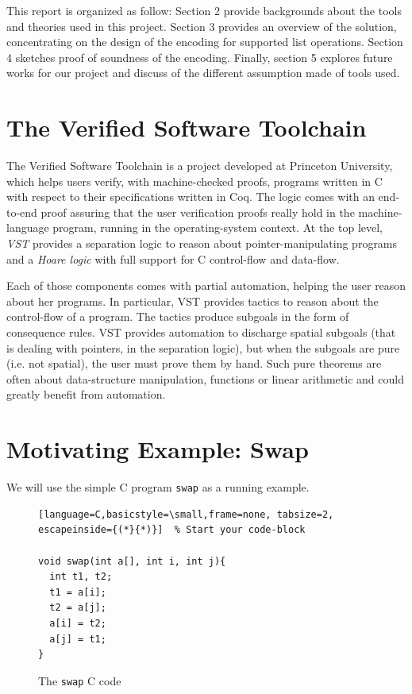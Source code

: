 \documentclass[onecolumn, preprint]{sigplanconf}
\begin{document}
This report is organized as follow: Section 2 provide backgrounds about the tools and theories used in this project. Section 3 provides an overview of the solution, concentrating on the design of the encoding for supported list operations. Section 4 sketches proof of soundness of the encoding. Finally, section 5 explores future works for our project and discuss of the different assumption made of tools used.

\section{The Verified Software Toolchain}
\label{sec:VST}

The Verified Software Toolchain is a project developed at Princeton University\cite{VST}, which helps users verify, with machine-checked proofs, programs written in C with respect to their specifications written in Coq. The logic comes with an end-to-end proof assuring that the user verification proofs really hold in the machine-language program, running in the operating-system context. At the top level, \emph{VST} provides a separation logic to reason about pointer-manipulating programs and a \emph{Hoare logic} with full support for C control-flow and data-flow. 

Each of those components comes with partial automation, helping the user reason about her programs. In particular, VST provides tactics to reason about the control-flow of a program. The tactics produce subgoals in the form of consequence rules. VST provides automation to discharge spatial subgoals (that is dealing with pointers, in the separation logic), but when the subgoals are pure (i.e. not spatial), the user must prove them by hand. Such pure theorems are often about data-structure manipulation, functions or linear arithmetic and could greatly benefit from automation.


\section{Motivating Example: Swap}
\label{sec:motiv}

We will use the simple C program \texttt{swap} as a running example.

\begin{figure}
\begin{lstlisting}[language=C,basicstyle=\small,frame=none, tabsize=2, escapeinside={(*}{*)}]  % Start your code-block

void swap(int a[], int i, int j){
  int t1, t2;
  t1 = a[i];
  t2 = a[j];
  a[i] = t2;
  a[j] = t1;
}
\end{lstlisting}
   \label{fig:swap}
   \caption{The \texttt{swap}  C code}
\end{figure}
\end{document}
